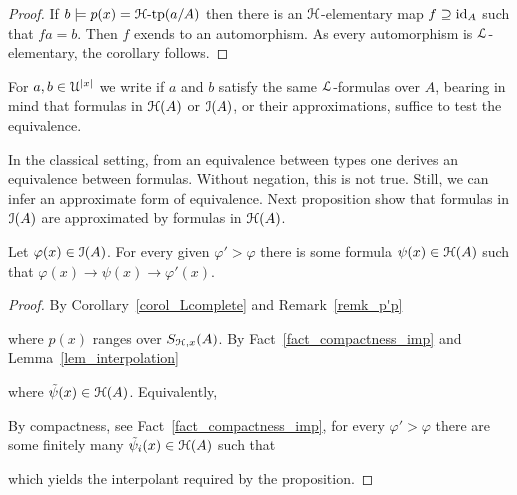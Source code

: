 \documentclass[10pt,oneside]{amsproc}
\renewcommand*{\emph}[1]{%
   \smash{\tikz[baseline]\node[rectangle, fill=teal!25, rounded corners, inner xsep=0.5ex, inner ysep=0.2ex, anchor=base, minimum height = 2.7ex]{\strut #1};}}
\begin{document}
\begin{proof}
  If $b\models p(x)={\EuScript H}\mbox{-tp}(a/A)$ then there is an ${\EuScript H}$-elementary map $f\supseteq{\rm id}_A$ such that $fa=b$.
  Then $f$ exends to an automorphism.
  As every automorphism is ${\EuScript L}$-elementary, the corollary follows.
\end{proof}

For $a,b\in {\EuScript U}^{|x|}$ we write \emph{$a\equiv_Ab$\/} if $a$ and $b$ satisfy the same ${\EuScript L}$-formulas over $A$, bearing in mind that formulas in ${\EuScript H}(A)$ or ${\EuScript I}(A)$, or their approximations, suffice to test the equivalence.

In the classical setting, from an equivalence between types one derives an  equivalence between formulas.
Without negation, this is not true.
Still, we can infer an approximate form of equivalence.
Next proposition show that formulas in ${\EuScript I}(A)$ are approximated by formulas in ${\EuScript H}(A)$.

\begin{proposition}\label{prop_LHapprox1}
  Let $\varphi(x)\in{\EuScript I}(A)$.
  For every given $\varphi'>\varphi$ there is some formula $\psi(x)\in{\EuScript H}(A)$ such that $\varphi(x)\rightarrow\psi(x)\rightarrow\varphi'(x)$.
\end{proposition}

\begin{proof}
  By Corollary~\ref{corol_Lcomplete} and Remark~\ref{remk_p'p}


  where $p(x)$ ranges over $S_{{\EuScript H},x}(A)$.
  By Fact~\ref{fact_compactness_imp} and Lemma~\ref{lem_interpolation}


  where $\tilde{\psi}(x)\in{\EuScript H}(A)$.
  Equivalently,


  By compactness, see Fact~\ref{fact_compactness_imp}, for every $\varphi'>\varphi$ there are some finitely many $\tilde{\psi}_i(x)\in{\EuScript H}(A)$ such that


  which yields the interpolant required by the proposition.
\end{proof}
\end{document}
